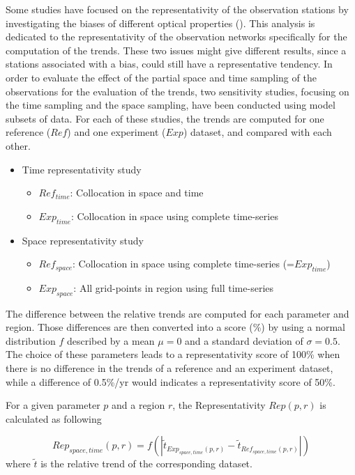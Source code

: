 \documentclass[journal abbreviation, manuscript]{copernicus}
\begin{document}
Some studies have focused on the representativity of the observation stations by investigating the biases of different optical properties (\cite{wang2017,schutgens2017spatio,schutgens2019site}). This analysis is dedicated to the  representativity of the observation networks specifically for the computation of the trends. These two issues might give different results, since a stations associated with a bias, could still have a representative tendency. In order to evaluate the effect of the partial space and time sampling of the observations for the evaluation of the trends, two sensitivity studies, focusing on the time sampling and the space sampling, have been conducted using model subsets of data. For each of these studies, the trends are computed for one reference ($Ref$) and one experiment ($Exp$) dataset, and compared with each other.
\begin{itemize}
 \item Time representativity study
       \begin{itemize}
        \item $Ref_{time}$: Collocation in space and time
        \item $Exp_{time}$: Collocation in space using complete time-series
       \end{itemize}
 \item Space representativity study
       \begin{itemize}
        \item $Ref_{space}$: Collocation in space using complete time-series (=$Exp_{time}$)
        \item $Exp_{space}$: All grid-points in region using full time-series
       \end{itemize}
\end{itemize}

The difference between the relative trends are computed for each parameter and region. Those differences are then converted into a score (\unit{\%}) by using a normal distribution $f$ described by a mean $\mu=0$ and a standard deviation of $\sigma=0.5$. The choice of these parameters leads to a representativity score of 100\% when there is no difference in the trends of a reference and an experiment dataset, while a difference of 0.5\%/yr would indicates a representativity score of 50\%.

For a given parameter $p$ and a region $r$, the Representativity $Rep(p,r)$ is calculated as following

\begin{equation}
 Rep_{space,time}(p, r) = {f\left(\left| \tilde{t}_{Exp_{space,time}(p, r)}-\tilde{t}_{Ref_{space,time}(p, r)} \right|\right)}
\end{equation}
where $\tilde{t}$ is the relative trend of the corresponding dataset.
\end{document}
